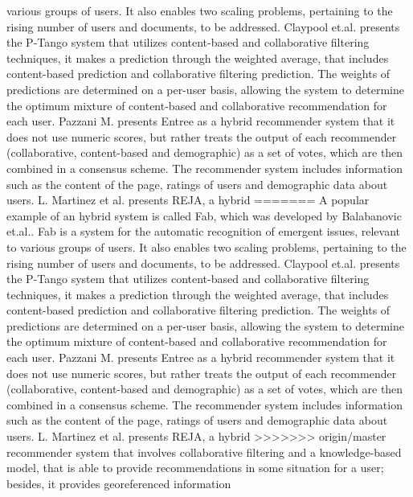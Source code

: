 various  groups of users. It also enables two scaling problems,
pertaining to the rising number of users and documents, to be
addressed.  Claypool et.al. \cite{claypool1999combining}  presents the
P-Tango system that utilizes content-based and collaborative filtering
techniques, it makes a prediction through the weighted average, that
includes content-based prediction and collaborative filtering
prediction. The weights of predictions are determined on a per-user
basis, allowing the system to determine the optimum mixture of
content-based and collaborative recommendation for each user. Pazzani
M. \cite{pazzani1999framework} presents Entree as a hybrid recommender
system that it does not use numeric scores, but rather treats the
output of each recommender (collaborative, content-based and
demographic) as a set of votes, which are then combined in a consensus
scheme. The recommender system includes information such as the
content of the page, ratings of users and demographic data about
users.
L. Martinez et al. \cite{martinez2009reja} presents REJA, a hybrid
=======
A popular example of an hybrid system is called Fab, which was developed by 
Balabanovic et.al.\cite{balabanovic1997fab}. Fab is a system 
for the automatic recognition of emergent issues, relevant to various 
groups of users. It also enables two scaling problems, 
pertaining to the rising number of users and documents, to be addressed. 
Claypool et.al.\cite{claypool1999combining} 
presents the P-Tango system that utilizes content-based and collaborative
filtering techniques, it makes a prediction through the weighted
average, that includes content-based prediction and collaborative
filtering prediction. The weights of predictions are determined on a
per-user basis, allowing the system to determine the optimum mixture
of content-based and collaborative recommendation for each user.
Pazzani M.\cite{pazzani1999framework} presents Entree as a hybrid
recommender system that it does not use numeric scores, but rather
treats the output of each recommender (collaborative, content-based
and demographic) as a set of votes, which are then combined in a
consensus scheme. The recommender system includes information such as
the content of the page, ratings of users and demographic data about
users. 
L. Martinez et al.\cite{martinez2009reja} presents REJA, a hybrid
>>>>>>> origin/master
recommender system that involves collaborative filtering and a
knowledge-based model, that is able to provide recommendations in some
situation for a user; besides, it provides georeferenced information
